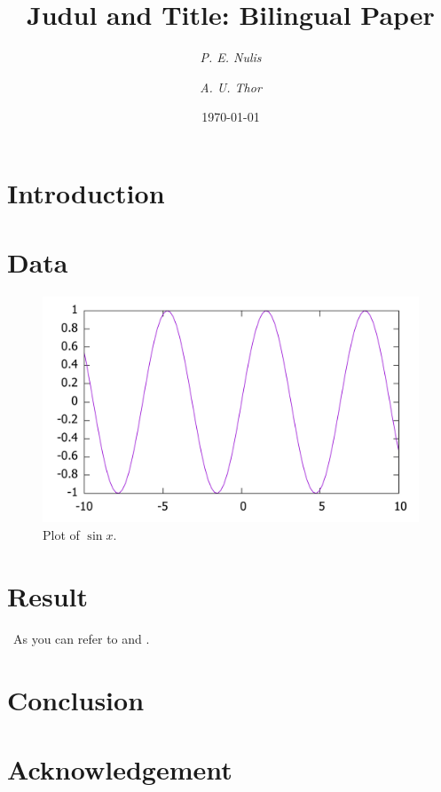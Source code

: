 \documentclass[11pt,a4paper]{article}
\title{Judul and Title: Bilingual Paper}
\author{\textit{P. E. Nulis} \and \textit{A. U. Thor}}
\date{\today}
\begin{document}
\maketitle

\begin{abstract}
\lipsum[1]
\end{abstract}

\begin{multicols}{2}

\section{Introduction}
\lipsum

\section{Data}
\lipsum

\end{multicols}

\begin{figure}
    \includegraphics[width=\linewidth]{plot}
    \caption[Plot of $\sin x$.]{Plot of $\sin x$.}
    \label{fig:plot}
\end{figure}

\begin{multicols}{2}

\section{Result}
\lipsum\ As you can refer to \cite{siess2000} and \cite{stepien2002}.

\section{Conclusion}
\lipsum

\section*{Acknowledgement}
\lipsum[4]




\end{multicols}
\end{document}
